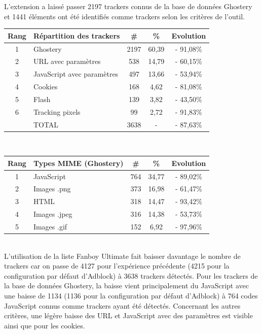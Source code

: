 L'extension a laissé passer 2197 trackers connus de la base de données Ghostery et 1441 éléments ont été identifiés comme trackers selon les critères de l'outil.\\

\begin{tabular}{ c | p{5cm} | c | c || c | }
   Rang & Répartition des trackers & \# & \% & Evolution \\
   \hline
   \hline
   1 & Ghostery & 2197 & 60,39 & - 91,08\% \\
   2 & URL avec paramètres & 538 & 14,79 & - 60,15\% \\
   3 & JavaScript avec paramètres & 497 & 13,66 & - 53,94\% \\
   4 & Cookies & 168 & 4,62 & - 81,08\% \\
   5 & Flash & 139 & 3,82 & - 43,50\% \\
   6 & Tracking pixels & 99 & 2,72 & - 91,83\% \\
   \hline
    & TOTAL & 3638 & - & - 87,63\%\\
   \hline
\end{tabular}
\\[1cm]

\begin{tabular}{ c | p{5cm} | c | c | c | }
   Rang & Types MIME (Ghostery) & \# & \% & Evolution\\
   \hline
   \hline
   1 & JavaScript & 764 & 34,77 & - 89,02\% \\
   2 & Images .png & 373 & 16,98 & - 61,47\% \\
   3 & HTML & 318 & 14,47 & - 93,42\% \\
   4 & Images .jpeg & 316 & 14,38 & - 53,73\% \\
   5 & Images .gif & 152 & 6,92 & - 97,96\% \\
   \hline
\end{tabular}
\\[.3cm]

L'utilisation de la liste Fanboy Ultimate fait baisser davantage le nombre de trackers car on passe de 4127 pour l'expérience précédente (4215 pour la configuration par défaut d'Adblock) à 3638 trackers détectés. Pour les trackers de la base de données Ghostery, la baisse vient principalement du JavaScript avec une baisse de 1134 (1136 pour la configuration par défaut d'Adblock) à 764 codes JavaScript connus comme trackers ayant été détectés. Concernant les autres critères, une légère baisse des URL et JavaScript avec des paramètres est visible ainsi que pour les cookies.

